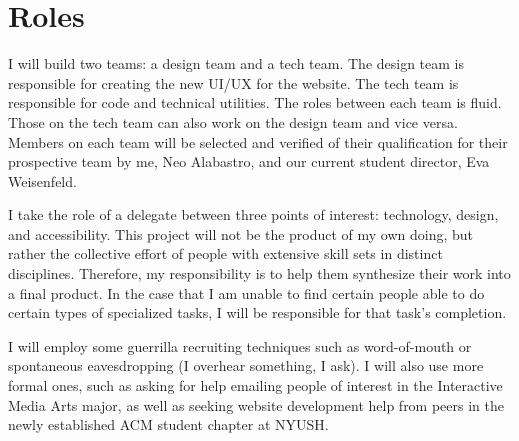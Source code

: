 \section{Roles}
I will build two teams: a design team and a tech team. The design team is responsible for creating the new UI/UX for the website. The tech team is responsible for code and technical utilities. The roles between each team is fluid. Those on the tech team can also work on the design team and vice versa. Members on each team will be selected and verified of their qualification for their prospective team by me, Neo Alabastro, and our current student director, Eva Weisenfeld.

I take the role of a delegate between three points of interest: technology, design, and accessibility. This project will not be the product of my own doing, but rather the collective effort of people with extensive skill sets in distinct disciplines. Therefore, my responsibility is to help them synthesize their work into a final product. In the case that I am unable to find certain people able to do certain types of specialized tasks, I will be responsible for that task's completion.

I will employ some guerrilla recruiting techniques such as word-of-mouth or spontaneous eavesdropping (I overhear something, I ask). I will also use more formal ones, such as asking for help emailing people of interest in the Interactive Media Arts major, as well as seeking website development help from peers in the newly established ACM student chapter at NYUSH.
